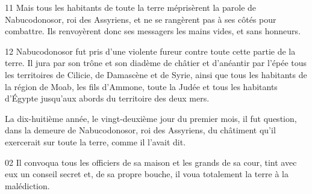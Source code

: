 
11 Mais tous les habitants de toute la terre méprisèrent la parole de Nabucodonosor, roi des Assyriens, et ne se rangèrent pas à ses côtés pour combattre. Ils renvoyèrent donc ses messagers les mains vides, et sans honneurs.

12 Nabucodonosor fut pris d'une violente fureur contre toute cette partie de la terre. Il jura par son trône et son diadème de châtier et d'anéantir par l'épée tous les territoires de Cilicie, de Damascène et de Syrie, ainsi que tous les habitants de la région de Moab, les fils d'Ammone, toute la Judée et tous les habitants d'Égypte jusqu'aux abords du territoire des deux mers.

La dix-huitième année, le vingt-deuxième jour du premier mois, il fut question, dans la demeure de Nabucodonosor, roi des Assyriens, du châtiment qu'il exercerait sur toute la terre, comme il l'avait dit.

02 Il convoqua tous les officiers de sa maison et les grands de sa cour, tint avec eux un conseil secret et, de sa propre bouche, il voua totalement la terre à la malédiction.